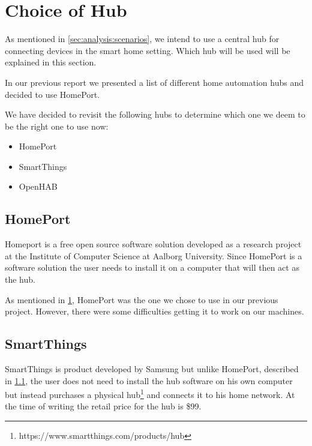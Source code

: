 \section{Choice of Hub}
\label{sec:analysis:choice-of-hub}

As mentioned in \cref{sec:analysis:scenarios}, we intend to use a central hub for connecting devices in the smart home setting. Which hub will be used will be explained in this section.

In our previous report \cite{previous-report} we presented a list of different home automation hubs and decided to use HomePort.

We have decided to revisit the following hubs to determine which one we deem to be the right one to use now:

\begin{itemize}
    \item HomePort
    \item SmartThings
    \item OpenHAB
\end{itemize}

\subsection{HomePort}
\label{sec:analysis:choice-of-hub:homeport}

Homeport \cite{HOMEPORT10,homeport:github} is a free open source software solution developed as a research project at the Institute of Computer Science at Aalborg University.
Since HomePort is a software solution the user needs to install it on a computer that will then act as the hub.

As mentioned in \cref{sec:analysis:choice-of-hub}, HomePort was the one we chose to use in our previous project. However, there were some difficulties getting it to work on our machines.

\subsection{SmartThings}
\label{sec:analysis:choice-of-hub:smartthings}

SmartThings \cite{SMARTTHINGS} is product developed by Samsung but unlike HomePort, described in \cref{sec:analysis:choice-of-hub:homeport}, the user does not need to install the hub software on his own computer but instead purchases a physical hub\footnote{https://www.smartthings.com/products/hub} and connects it to his home network.
At the time of writing the retail price for the hub is \$99.

